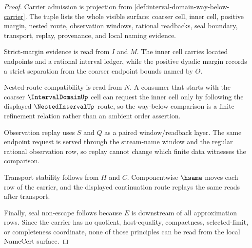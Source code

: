 \begin{proof}
Carrier admission is projection from \autoref{def:interval-domain-way-below-carrier}. The tuple lists the whole visible surface: coarser cell, inner cell, positive margin, nested route, observation windows, rational readbacks, seal boundary, transport, replay, provenance, and local naming evidence.

Strict-margin evidence is read from $I$ and $M$. The inner cell carries located endpoints and a rational interval ledger, while the positive dyadic margin records a strict separation from the coarser endpoint bounds named by $O$.

Nested-route compatibility is read from $N$. A consumer that starts with the coarser $\IntervalDomainUp$ cell can request the inner cell only by following the displayed $\NestedIntervalUp$ route, so the way-below comparison is a finite refinement relation rather than an ambient order assertion.

Observation replay uses $S$ and $Q$ as a paired window/readback layer. The same endpoint request is served through the stream-name window and the regular rational observation row, so replay cannot change which finite data witnesses the comparison.

Transport stability follows from $H$ and $C$. Componentwise $\hsame$ moves each row of the carrier, and the displayed continuation route replays the same reads after transport.

Finally, seal non-escape follows because $E$ is downstream of all approximation rows. Since the carrier has no quotient, host-equality, compactness, selected-limit, or completeness coordinate, none of those principles can be read from the local NameCert surface.
\end{proof}

